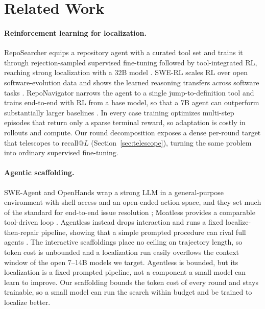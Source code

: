 \section{Related Work}
\label{sec:related}

\paragraph{Reinforcement learning for localization.}
RepoSearcher equips a repository agent with a curated tool set
and trains it through rejection-sampled supervised fine-tuning
followed by tool-integrated RL, reaching strong localization
with a 32B model \citep{ma2025tooltrain}. SWE-RL scales RL over
open software-evolution data and shows the learned reasoning
transfers across software tasks \citep{wei2025swerl}.
RepoNavigator narrows the agent to a single jump-to-definition
tool and trains end-to-end with RL from a base model, so that a
7B agent can outperform substantially larger baselines
\citep{zhang2025reponavigator}. In every case training optimizes
multi-step episodes that return only a sparse terminal reward,
so adaptation is costly in rollouts and compute. Our round
decomposition exposes a dense per-round target that telescopes
to recall@$L$ (Section~\ref{sec:telescope}), turning the same
problem into ordinary supervised fine-tuning.

\paragraph{Agentic scaffolding.}
SWE-Agent and OpenHands wrap a strong LLM in a general-purpose
environment with shell access and an open-ended action space,
and they set much of the standard for end-to-end issue
resolution \citep{yang2024sweagent, wang2025openhands}; Moatless
provides a comparable tool-driven loop \citep{orwall2024moatless}.
Agentless instead drops interaction and runs a fixed
localize-then-repair pipeline, showing that a simple prompted
procedure can rival full agents \citep{xia2024agentless}. The
interactive scaffoldings place no ceiling on trajectory length,
so token cost is unbounded and a localization run easily
overflows the context window of the open 7--14B models we
target. Agentless is bounded, but its localization is a fixed
prompted pipeline, not a component a small model can learn to
improve. Our scaffolding bounds the token cost of every round
and stays trainable, so a small model can run the search within
budget and be trained to localize better.

